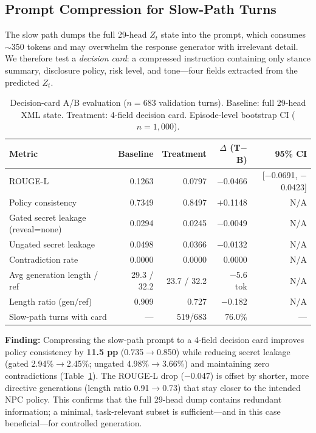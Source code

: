 \documentclass[11pt]{article}
\begin{document}
\subsection{Prompt Compression for Slow-Path Turns}
\label{sec:decision_card}

The slow path dumps the full 29-head $Z_t$ state into the prompt, which consumes $\sim$350 tokens and may overwhelm the response generator with irrelevant detail.
We therefore test a \textit{decision card}: a compressed instruction containing only stance summary, disclosure policy, risk level, and tone---four fields extracted from the predicted $Z_t$.

\begin{table}[t]
\centering
\caption{Decision-card A/B evaluation ($n{=}683$ validation turns). Baseline: full 29-head XML state. Treatment: 4-field decision card. Episode-level bootstrap CI ($n{=}1{,}000$).}
\label{tab:decision_card}
\small
\begin{tabular}{@{}lrrrr@{}}
\toprule
\textbf{Metric} & \textbf{Baseline} & \textbf{Treatment} & \textbf{$\Delta$ (T$-$B)} & \textbf{95\% CI} \\
\midrule
ROUGE-L & 0.1263 & 0.0797 & $-$0.0466 & [$-$0.0691, $-$0.0423] \\
Policy consistency & 0.7349 & 0.8497 & $+$0.1148 & N/A \\
Gated secret leakage (reveal=none) & 0.0294 & 0.0245 & $-$0.0049 & N/A \\
Ungated secret leakage & 0.0498 & 0.0366 & $-$0.0132 & N/A \\
Contradiction rate & 0.0000 & 0.0000 & 0.0000 & N/A \\
Avg generation length / ref & 29.3 / 32.2 & 23.7 / 32.2 & $-$5.6 tok & N/A \\
Length ratio (gen/ref) & 0.909 & 0.727 & $-$0.182 & N/A \\
Slow-path turns with card & --- & 519/683 & 76.0\% & --- \\
\bottomrule
\end{tabular}
\end{table}

\textbf{Finding:} Compressing the slow-path prompt to a 4-field decision card improves policy consistency by \textbf{11.5 pp} (0.735$\to$0.850) while reducing secret leakage (gated 2.94\%$\to$2.45\%; ungated 4.98\%$\to$3.66\%) and maintaining zero contradictions (Table~\ref{tab:decision_card}).
The ROUGE-L drop ($-$0.047) is offset by shorter, more directive generations (length ratio 0.91$\to$0.73) that stay closer to the intended NPC policy.
This confirms that the full 29-head dump contains redundant information; a minimal, task-relevant subset is sufficient---and in this case beneficial---for controlled generation.
\end{document}
